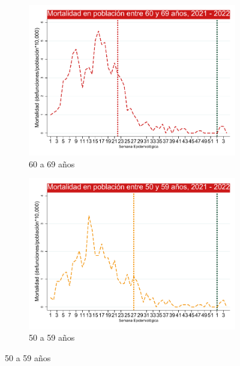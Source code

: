 \documentclass[12pt,a4paper,openany]{book}
\begin{document}
\begin{figure}[h]
	\vspace{10mm}
	\begin{subfigure}[b]{0.45\textwidth}
		\centering
		\includegraphics[width=\textwidth]{../figuras/mortalidad_edad_60.pdf}
		\caption{60 a 69 años}
	\end{subfigure}
	\hfill
	\begin{subfigure}[b]{0.45\textwidth}
		\centering
		\includegraphics[width=\textwidth]{../figuras/mortalidad_edad_50.pdf}
		\caption{50 a 59 años}
	\end{subfigure}


\end{figure}
\end{document}
